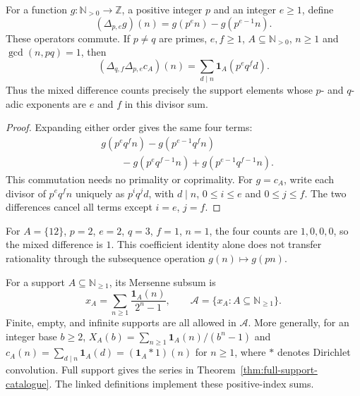 \begin{lem}
\label{lem:mixed-prime-power-layer}
For a function $g:\mathbb N_{>0}\to\mathbb Z$, a positive integer $p$
and an integer $e\ge1$, define
\[
 (\Delta_{p,e}g)(n)=g(p^en)-g(p^{e-1}n).
\]
These operators commute.  If $p\ne q$ are primes, $e,f\ge1$,
$A\subseteq\mathbb N_{>0}$, $n\ge1$ and $\gcd(n,pq)=1$, then
\[
 (\Delta_{q,f}\Delta_{p,e}c_A)(n)
   =\sum_{d\mid n}\mathbf1_A(p^eq^fd).
\]
Thus the mixed difference counts precisely the support elements
whose $p$- and $q$-adic exponents are $e$ and $f$ in this divisor sum.
\end{lem}
\begin{proof}
Expanding either order gives the same four terms:
\[
 \begin{aligned}
 &g(p^eq^fn)-g(p^{e-1}q^fn)\\
 &\qquad{}-g(p^eq^{f-1}n)+g(p^{e-1}q^{f-1}n).
 \end{aligned}
\]
This commutation needs no primality or coprimality.  For $g=c_A$,
write each divisor of $p^eq^fn$ uniquely as $p^iq^jd$, with
$d\mid n$, $0\le i\le e$ and $0\le j\le f$.  The two differences
cancel all terms except $i=e$, $j=f$.
\end{proof}
For $A=\{12\}$, $p=2$, $e=2$, $q=3$, $f=1$, $n=1$, the
four counts are $1,0,0,0$, so the mixed difference is $1$.
This coefficient identity alone does not transfer rationality through
the subsequence operation $g(n)\mapsto g(pn)$.


\begin{defn}
\label{defn:achievement-set}
For a support $A\subseteq\mathbb N_{\ge1}$, its Mersenne subsum is
\[
 x_A=\sum_{n\ge1}\frac{\mathbf1_A(n)}{2^n-1},
 \qquad
 \mathcal A=\{x_A:A\subseteq\mathbb N_{\ge1}\}.
\]
Finite, empty, and infinite supports are all allowed in $\mathcal A$.
More generally, for an integer base $b\ge2$,
$X_A(b)=\sum_{n\ge1}\mathbf1_A(n)/(b^n-1)$ and
$c_A(n)=\sum_{d\mid n}\mathbf1_A(d)=(\mathbf1_A*1)(n)$ for $n\ge1$,
where $*$ denotes Dirichlet convolution.  Full support gives the series
in Theorem~\ref{thm:full-support-catalogue}.  The linked definitions
implement these positive-index sums.
\par
{}
\end{defn}

